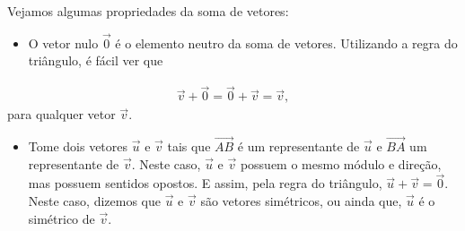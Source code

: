Vejamos algumas propriedades da soma de vetores:
\begin{itemize}
\item {} 
O vetor nulo \(\vec{0}\) é o elemento neutro da soma de vetores. Utilizando a regra do triângulo, é fácil ver que

\end{itemize}
\begin{equation*}
\begin{split}\vec{v} + \vec{0} = \vec{0} + \vec{v} = \vec{v},\end{split}
\end{equation*}
para qualquer vetor \(\vec{v}\).
\begin{itemize}
\item {} 
Tome dois vetores \(\vec{u}\) e \(\vec{v}\) tais que \(\overrightarrow{AB}\) é um representante de \(\vec{u}\) e \(\overrightarrow{BA}\) um representante de \(\vec{v}\). Neste caso, \(\vec{u}\) e \(\vec{v}\) possuem o mesmo módulo e direção, mas possuem sentidos opostos. E assim, pela regra do triângulo, \(\vec{u}+\vec{v} = \vec{0}\). Neste caso, dizemos que \(\vec{u}\) e \(\vec{v}\) são vetores simétricos, ou ainda que, \(\vec{u}\) é o simétrico de \(\vec{v}\).

\end{itemize}

